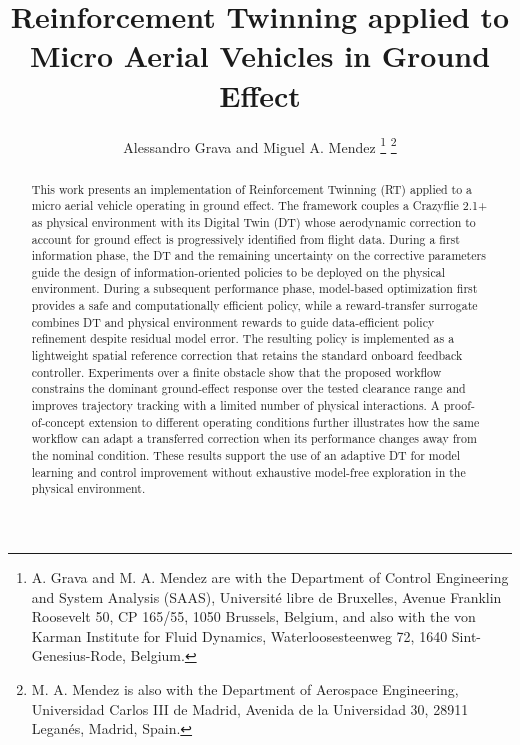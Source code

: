 \documentclass[journal]{IEEEtran}
\begin{document}
\title{Reinforcement Twinning applied to Micro Aerial Vehicles in Ground Effect}

\author{Alessandro Grava and Miguel A. Mendez%
\thanks{A. Grava and M. A. Mendez are with the Department of Control Engineering and System Analysis (SAAS), Universit\'e libre de Bruxelles, Avenue Franklin Roosevelt 50, CP 165/55, 1050 Brussels, Belgium, and also with the von Karman Institute for Fluid Dynamics, Waterloosesteenweg 72, 1640 Sint-Genesius-Rode, Belgium.}%
\thanks{M. A. Mendez is also with the Department of Aerospace Engineering, Universidad Carlos III de Madrid, Avenida de la Universidad 30, 28911 Legan\'es, Madrid, Spain.}}

\markboth{}{}
\maketitle

\begin{abstract}This work presents an implementation of Reinforcement Twinning (RT) applied to a micro aerial vehicle operating in ground effect. The framework couples a Crazyflie 2.1+ as physical environment with its Digital Twin (DT) whose aerodynamic correction to account for ground effect is progressively identified from flight data. During a first information phase, the DT and the remaining uncertainty on the corrective parameters guide the design of information-oriented policies to be deployed on the physical environment. During a subsequent performance phase, model-based optimization first provides a safe and computationally efficient policy, while a reward-transfer surrogate combines DT and physical environment rewards to guide data-efficient policy refinement despite residual model error. The resulting policy is implemented as a lightweight spatial reference correction that retains the standard onboard feedback controller. Experiments over a finite obstacle show that the proposed workflow constrains the dominant ground-effect response over the tested clearance range and improves trajectory tracking with a limited number of physical interactions. A proof-of-concept extension to different operating conditions further illustrates how the same workflow can adapt a transferred correction when its performance changes away from the nominal condition. These results support the use of an adaptive DT for model learning and control improvement without exhaustive model-free exploration in the physical environment.\end{abstract}
\end{document}
